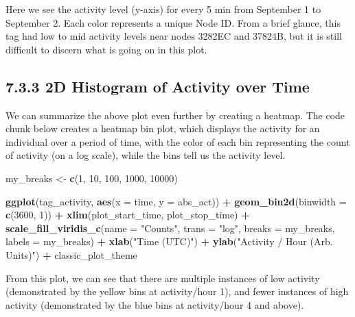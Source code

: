 \documentclass[
]{book}
\newenvironment{Shaded}{\begin{snugshade}}{\end{snugshade}}
\newcommand{\AttributeTok}[1]{\textcolor[rgb]{0.13,0.29,0.53}{#1}}
\newcommand{\DecValTok}[1]{\textcolor[rgb]{0.00,0.00,0.81}{#1}}
\newcommand{\FunctionTok}[1]{\textcolor[rgb]{0.13,0.29,0.53}{\textbf{#1}}}
\newcommand{\NormalTok}[1]{#1}
\newcommand{\OtherTok}[1]{\textcolor[rgb]{0.56,0.35,0.01}{#1}}
\newcommand{\SpecialCharTok}[1]{\textcolor[rgb]{0.81,0.36,0.00}{\textbf{#1}}}
\newcommand{\StringTok}[1]{\textcolor[rgb]{0.31,0.60,0.02}{#1}}
\begin{document}
Here we see the activity level (y-axis) for every 5 min from September 1 to September 2. Each color represents a unique Node ID. From a brief glance, this tag had low to mid activity levels near nodes 3282EC and 37824B, but it is still difficult to discern what is going on in this plot.

\subsection{7.3.3 2D Histogram of Activity over Time}\label{d-histogram-of-activity-over-time}

We can summarize the above plot even further by creating a heatmap. The code chunk below creates a heatmap bin plot, which displays the activity for an individual over a period of time, with the color of each bin representing the count of activity (on a log scale), while the bins tell us the activity level.

\begin{Shaded}
\begin{Highlighting}[]
\NormalTok{my\_breaks }\OtherTok{\textless{}{-}} \FunctionTok{c}\NormalTok{(}\DecValTok{1}\NormalTok{, }\DecValTok{10}\NormalTok{, }\DecValTok{100}\NormalTok{, }\DecValTok{1000}\NormalTok{, }\DecValTok{10000}\NormalTok{)}

\FunctionTok{ggplot}\NormalTok{(tag\_activity, }
       \FunctionTok{aes}\NormalTok{(}\AttributeTok{x =}\NormalTok{ time, }
           \AttributeTok{y =}\NormalTok{ abs\_act)) }\SpecialCharTok{+}
  \FunctionTok{geom\_bin2d}\NormalTok{(}\AttributeTok{binwidth =} \FunctionTok{c}\NormalTok{(}\DecValTok{3600}\NormalTok{, }\DecValTok{1}\NormalTok{)) }\SpecialCharTok{+}
  \FunctionTok{xlim}\NormalTok{(plot\_start\_time, plot\_stop\_time) }\SpecialCharTok{+}
  \FunctionTok{scale\_fill\_viridis\_c}\NormalTok{(}\AttributeTok{name =} \StringTok{"Counts"}\NormalTok{, }
                       \AttributeTok{trans =} \StringTok{"log"}\NormalTok{, }
                       \AttributeTok{breaks =}\NormalTok{ my\_breaks, }
                       \AttributeTok{labels =}\NormalTok{ my\_breaks) }\SpecialCharTok{+}
  \FunctionTok{xlab}\NormalTok{(}\StringTok{"Time (UTC)"}\NormalTok{) }\SpecialCharTok{+}
  \FunctionTok{ylab}\NormalTok{(}\StringTok{"Activity / Hour (Arb. Units)"}\NormalTok{) }\SpecialCharTok{+}  
\NormalTok{  classic\_plot\_theme}
\end{Highlighting}
\end{Shaded}

From this plot, we can see that there are multiple instances of low activity (demonstrated by the yellow bins at activity/hour 1), and fewer instances of high activity (demonstrated by the blue bins at activity/hour 4 and above).
\end{document}
